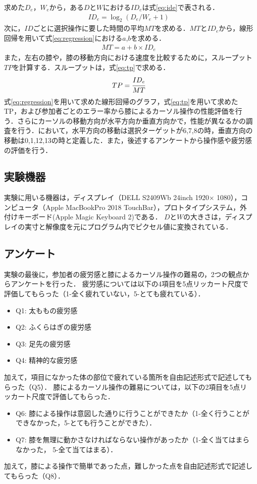 \documentclass[submit, techrep]{ipsj}
\begin{document}
求めた$D_e$，$W_e$から，ある$D$と$W$における$ID_e$は式\ref{eq:ide}で表される．
\begin{eqnarray}
	ID_e = \log_2{(D_e/W_e + 1)}
	\label{eq:ide}
\end{eqnarray}
次に，$ID$ごとに選択操作に要した時間の平均$MT$を求める．$MT$と$ID_e$から，線形回帰を用いて式\ref{eq:regression}における$a$,$b$を求める．
\begin{eqnarray}
	MT = a + b \times  ID_e
	\label{eq:regression}
\end{eqnarray}
また，左右の膝や，膝の移動方向における速度を比較するために，スループット$TP$を計算する．スループットは，式\ref{eq:tp}で求める．
\begin{eqnarray}
	TP = \cfrac{ID_e}{MT}
	\label{eq:tp}
\end{eqnarray}
式\ref{eq:regression}を用いて求めた線形回帰のグラフ，式\ref{eq:tp}を用いて求めたTP，および参加者ごとのエラー率から膝によるカーソル操作の性能評価を行う．さらにカーソルの移動方向が水平方向か垂直方向かで，性能が異なるかの調査を行う．において，水平方向の移動は選択ターゲットが6,7,8の時，垂直方向の移動は0,1,12,13の時と定義した．また，後述するアンケートから操作感や疲労感の評価を行う．

\subsection{実験機器}
実験に用いる機器は，ディスプレイ（DELL S2409Wb 24inch 1920$\times$ 1080），コンピュータ（Apple MacBookPro 2018 TouchBar），プロトタイプシステム，外付けキーボード(Apple Magic Keyboard 2)である．
$D$と$W$の大きさは，ディスプレイの実寸と解像度を元にプログラム内でピクセル値に変換されている．
\subsection{アンケート}
実験の最後に，参加者の疲労感と膝によるカーソル操作の難易の，2つの観点からアンケートを行った．
疲労感については以下の4項目を5点リッカート尺度で評価してもらった（1-全く疲れていない，5-とても疲れている）．
\begin{itemize}
	\item {Q1: }太ももの疲労感
	\item {Q2: }ふくらはぎの疲労感
	\item {Q3: }足先の疲労感
	\item {Q4: }精神的な疲労感
\end{itemize}
加えて，項目になかった体の部位で疲れている箇所を自由記述形式で記述してもらった（Q5）．
膝によるカーソル操作の難易については，以下の2項目を5点リッカート尺度で評価してもらった．
\begin{itemize}
	\item {Q6: }膝による操作は意図した通りに行うことができたか（1-全く行うことができなかった，5-とても行うことができた）．
	\item {Q7: }膝を無理に動かさなければならない操作があったか（1-全く当てはまらなかった， 5-全て当てはまる）．
\end{itemize}
加えて，膝による操作で簡単であった点，難しかった点を自由記述形式で記述してもらった（Q8）．
\end{document}
